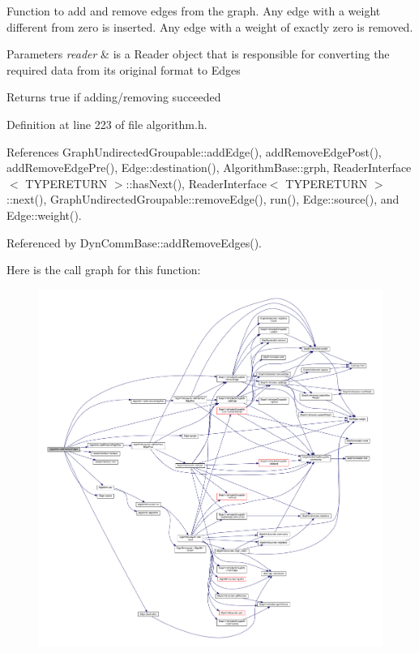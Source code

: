 Function to add and remove edges from the graph. Any edge with a weight different from zero is inserted. Any edge with a weight of exactly zero is removed.


\begin{DoxyParams}{Parameters}
{\em reader} & is a Reader object that is responsible for converting the required data from its original format to Edges \\
\hline
\end{DoxyParams}
\begin{DoxyReturn}{Returns}
true if adding/removing succeeded 
\end{DoxyReturn}


Definition at line 223 of file algorithm.\+h.



References Graph\+Undirected\+Groupable\+::add\+Edge(), add\+Remove\+Edge\+Post(), add\+Remove\+Edge\+Pre(), Edge\+::destination(), Algorithm\+Base\+::grph, Reader\+Interface$<$ T\+Y\+P\+E\+R\+E\+T\+U\+R\+N $>$\+::has\+Next(), Reader\+Interface$<$ T\+Y\+P\+E\+R\+E\+T\+U\+R\+N $>$\+::next(), Graph\+Undirected\+Groupable\+::remove\+Edge(), run(), Edge\+::source(), and Edge\+::weight().



Referenced by Dyn\+Comm\+Base\+::add\+Remove\+Edges().

Here is the call graph for this function\+:
\nopagebreak
\begin{figure}[H]
\begin{center}
\leavevmode
\includegraphics[width=350pt]{classAlgorithm_a8ec65e07ed59a0f8b8491683b95626d2_cgraph}
\end{center}
\end{figure}
\mbox{\label{classAlgorithm_a10dcb6b63ba40fad0bf11a0fef7b40f5}} 
